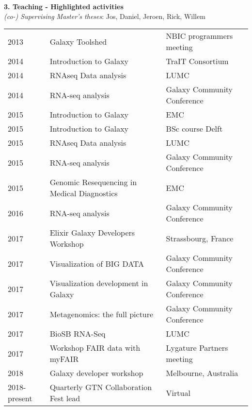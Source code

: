 \begin{table}[h!]
    \textbf{3. Teaching - Highlighted activities} \\

    \textit{(co-) Supervising Master’s theses}: Jos, Daniel, Jeroen, Rick, Willem \\


    \begin{tabular}{lll}
        2013 & Galaxy Toolshed                                 & NBIC programmers meeting \\
        2014 & Introduction to Galaxy                          & TraIT Consortium \\
        2014 & RNAseq Data analysis                            & LUMC \\
        2014 & RNA-seq analysis                                & Galaxy Community Conference \\
        2015 & Introduction to Galaxy                          & EMC \\
        2015 & Introduction to Galaxy                          & BSc course Delft \\
        2015 & RNAseq Data analysis                            & LUMC \\
        2015 & RNA-seq analysis                                & Galaxy Community Conference \\
        2015 & Genomic Resequencing in Medical Diagnostics     & EMC \\
        2016 & RNA-seq analysis                                & Galaxy Community Conference \\
        2017 & Elixir Galaxy Developers Workshop               & Strassbourg, France \\
        2017 & Visualization of BIG DATA                       & Galaxy Community Conference \\
        2017 & Visualization development in Galaxy             & Galaxy Community Conference \\
        2017 & Metagenomics: the full picture                  & Galaxy Community Conference \\
        2017 & BioSB RNA-Seq                                   & LUMC \\
        2017 & Workshop FAIR data with myFAIR                  & Lygature Partners meeting \\
        2018 & Galaxy developer workshop                       & Melbourne, Australia \\
        2018-present & Quarterly GTN Collaboration Fest lead   & Virtual \\

\end{tabular}
\end{table}

